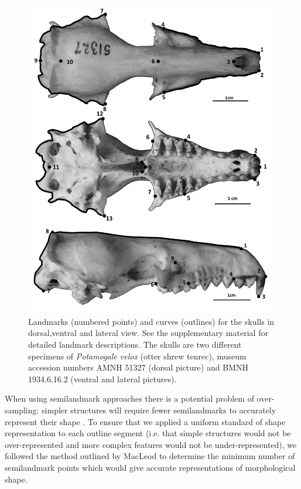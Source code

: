 \documentclass[12pt,a4paper]{article}
\begin{document}
	\begin{figure}[!htbp]
		\centering
		\includegraphics[width=1\linewidth]{figures/skdors+skvent+sklat_BW.png}
		\caption[Skulls: dorsal, ventral and lateral landmarks]
		{Landmarks (numbered points) and curves (outlines) for the skulls in dorsal,ventral and lateral view. See the supplementary material for detailed landmark descriptions. The skulls are two different specimens of \textit{Potamogale velox} (otter shrew tenrec), museum accession numbers AMNH 51327 (dorsal picture) and BMNH 1934.6.16.2 (ventral and lateral pictures). }
		\label{fig:landmarks}
	\end{figure}

	When using semilandmark approaches there is a potential problem of over-sampling: simpler structures will require fewer semilandmarks to accurately represent their shape \citep{MacLeod2012}. To ensure that we applied a uniform standard of shape representation to each outline segment (i.e. that simple structures would not be over-represented and more complex features would not be under-represented), we followed the method outlined by MacLeod \citeyearpar{MacLeod2012} to determine the minimum number of semilandmark points which would give accurate representations of morphological shape.
	
\end{document}
